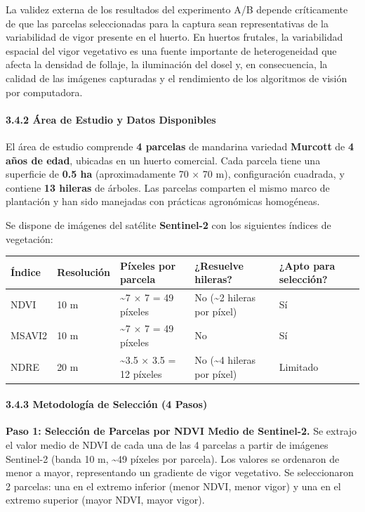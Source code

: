 La validez externa de los resultados del experimento A/B depende críticamente de que las parcelas seleccionadas para la captura sean representativas de la variabilidad de vigor presente en el huerto. En huertos frutales, la variabilidad espacial del vigor vegetativo es una fuente importante de heterogeneidad que afecta la densidad de follaje, la iluminación del dosel y, en consecuencia, la calidad de las imágenes capturadas y el rendimiento de los algoritmos de visión por computadora.


\paragraph{3.4.2 Área de Estudio y Datos Disponibles}


El área de estudio comprende \textbf{4 parcelas} de mandarina variedad \textbf{Murcott} de \textbf{4 años de edad}, ubicadas en un huerto comercial. Cada parcela tiene una superficie de \textbf{0.5 ha} (aproximadamente 70 × 70 m), configuración cuadrada, y contiene \textbf{13 hileras} de árboles. Las parcelas comparten el mismo marco de plantación y han sido manejadas con prácticas agronómicas homogéneas.


Se dispone de imágenes del satélite \textbf{Sentinel-2} con los siguientes índices de vegetación:



\begin{tabular}{lllll}
\hline
Índice & Resolución & Píxeles por parcela & ¿Resuelve hileras? & ¿Apto para selección? \\
\hline
NDVI & 10 m & \textasciitilde{}7 × 7 = 49 píxeles & No (\textasciitilde{}2 hileras por píxel) & Sí \\
MSAVI2 & 10 m & \textasciitilde{}7 × 7 = 49 píxeles & No & Sí \\
NDRE & 20 m & \textasciitilde{}3.5 × 3.5 = 12 píxeles & No (\textasciitilde{}4 hileras por píxel) & Limitado \\
\hline
\end{tabular}


\paragraph{3.4.3 Metodología de Selección (4 Pasos)}


\textbf{Paso 1: Selección de Parcelas por NDVI Medio de Sentinel-2.} Se extrajo el valor medio de NDVI de cada una de las 4 parcelas a partir de imágenes Sentinel-2 (banda 10 m, \textasciitilde{}49 píxeles por parcela). Los valores se ordenaron de menor a mayor, representando un gradiente de vigor vegetativo. Se seleccionaron 2 parcelas: una en el extremo inferior (menor NDVI, menor vigor) y una en el extremo superior (mayor NDVI, mayor vigor).


